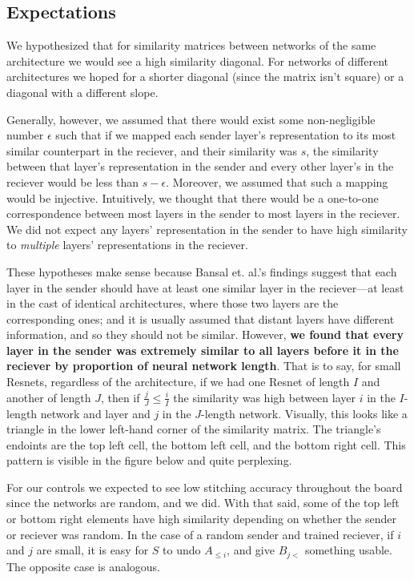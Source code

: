 \documentclass{article}
\begin{document}
\subsection{Expectations}
We hypothesized that for similarity matrices between networks of the same architecture we would
see a high similarity diagonal. For networks of different architectures we hoped for a shorter diagonal
(since the matrix isn't square) or a diagonal with a different slope.

Generally, however, we assumed
that there would exist some non-negligible number $\epsilon$ such that if we mapped each
sender layer's representation to its most similar counterpart in the reciever,
and their similarity was $s$, the similarity between that layer's representation 
in the sender and every other layer's in the reciever would be
less than $s - \epsilon$. Moreover, we assumed that such a mapping would be injective. Intuitively,
we thought that there would be a one-to-one correspondence between most layers in the sender
to most layers in the reciever. We did not expect any layers' representation in the sender to have 
high similarity to \textit{multiple} layers' representations in the reciever.

These hypotheses make sense because Bansal et. al.'s findings suggest that each layer in the sender
should have at least one similar layer in the reciever---at least in the cast of identical architectures,
where those two layers are the corresponding ones; and it is usually assumed that distant layers
have different information, and so they should not be similar. However, \textbf{we found that every
layer in the sender was extremely similar to all layers before it in the reciever by proportion of
neural network length}. That is to say, for small Resnets,
regardless of the architecture, if we had one Resnet of length $I$ and another of length $J$, then if
$\frac{j}{J} \leq \frac{i}{I}$ the similarity was high between layer $i$ in the $I$-length network and 
layer and $j$ in the $J$-length network. Visually, this looks
like a triangle in the lower left-hand corner of the similarity matrix. The triangle's endoints are the top left cell,
the bottom left cell, and the bottom right cell. This pattern is visible in the figure below and quite perplexing.

For our controls we expected to see low stitching accuracy throughout the board since the networks are random,
and we did. With that said, some of the top left or bottom right elements have high similarity depending on
whether the sender or reciever was random. In the case of a random sender and trained reciever, if $i$ and $j$
are small, it is easy for $S$ to undo $A_{\leq i}$, and give $B_{j<}$ something usable. The opposite
case is analogous.
\end{document}
